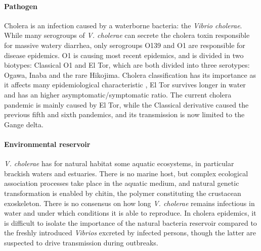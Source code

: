 \paragraph{Pathogen} Cholera is an infection caused by a waterborne bacteria: the \emph{Vibrio cholerae}. While many serogroups of \emph{V. cholerae} can secrete the cholera toxin responsible for massive watery diarrhea, only serogroups O139 and O1 are responsible for disease epidemics. O1 is causing most recent epidemics, and is divided in two biotypes: Classical O1 and El Tor, which are both divided into three serotypes: Ogawa, Inaba and the rare Hikojima\cite{Kaper:Cholera:1995}. Cholera classification has its importance as it affects many epidemiological characteristic \eg, El Tor survives longer in water and has an higher asymptomatic/symptomatic ratio\cite{WHO:CholeraVaccinesWHO:2017}. The current cholera pandemic is mainly caused by El Tor, while the Classical derivative caused the previous fifth and sixth pandemics, and its transmission is now limited to the Gange delta\cite{Nair:CholeraDueAltered:2006, Domman:DefiningEndemicCholera:2018}. 

 \paragraph{Environmental reservoir}  \textit{V. cholerae} has for natural habitat some aquatic ecosystems, in particular brackish waters and estuaries. There is no marine host, but complex ecological association processes take place in the aquatic medium, and natural genetic transformation is enabled by chitin, the polymer constituting the crustacean exoskeleton\cite{Reidl:VibrioCholeraeCholera:2002,Meibom:ChitinInducesNatural:2005}. There is no consensus on how long \textit{V. cholerae} remains infectious in water and under which conditions it is able to reproduce\cite{Mavian:ToxigenicVibrioCholerae:2020}. In cholera epidemics, it is difficult to isolate the importance of the natural bacteria reservoir compared to the freshly introduced \textit{Vibrios} excreted by infected persons, though the latter are suspected to drive transmission during outbreaks.

